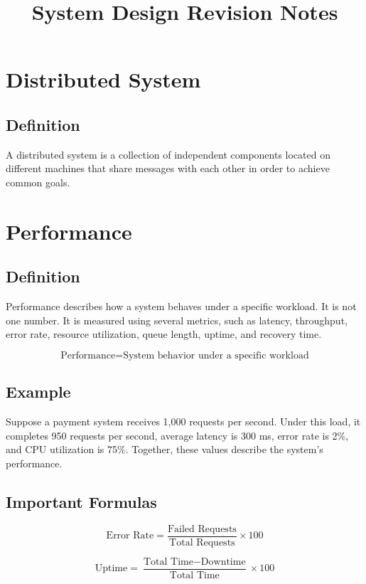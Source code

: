 \documentclass[11pt]{article}
\title{\textbf{System Design Revision Notes}}
\author{}
\date{}
\begin{document}
\maketitle

\section{Distributed System}

\subsection*{Definition}

A distributed system is a collection of independent components located on different machines that share messages with each other in order to achieve common goals.

\section{Performance}

\subsection*{Definition}

Performance describes how a system behaves under a specific workload. It is not one number. It is measured using several metrics, such as latency, throughput, error rate, resource utilization, queue length, uptime, and recovery time.

\[
\boxed{\text{Performance} = \text{System behavior under a specific workload}}
\]

\subsection*{Example}

Suppose a payment system receives 1,000 requests per second. Under this load, it completes 950 requests per second, average latency is 300 ms, error rate is 2\%, and CPU utilization is 75\%. Together, these values describe the system's performance.

\subsection*{Important Formulas}

\[
\text{Error Rate}
=
\frac{\text{Failed Requests}}{\text{Total Requests}}
\times 100
\]

\[
\text{Uptime}
=
\frac{\text{Total Time} - \text{Downtime}}{\text{Total Time}}
\times 100
\]
\end{document}
